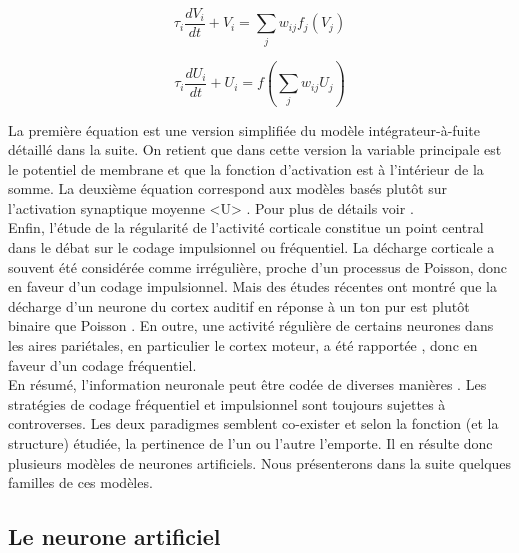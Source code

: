\begin{center}
\begin{equation} 
\tau_i \frac{dV_i}{dt}+V_i= \sum_{j} {w_{ij} f_j(V_j)} 
 \end{equation}
\label{vol}
\end{center}

\begin{center}
\begin{equation} 
\tau_i \frac{dU_i}{dt}+U_i= f(\sum_{j} {w_{ij} U_j} )
 \end{equation}
\label{act}
\end{center}

La première équation est une version simplifiée du modèle intégrateur-à-fuite détaillé dans la suite. On retient que dans cette version la variable principale est le potentiel de membrane et que la fonction d'activation est à l'intérieur de la somme. La deuxième équation correspond aux modèles basés plutôt sur l'activation synaptique moyenne <U> \cite{Gutkin:2003, Wilson:1972, Pinto:1996}. Pour plus de détails voir \cite{Ermentrout:1998}.\\

Enfin, l'étude de la régularité de l'activité corticale constitue un point central dans le débat sur le codage impulsionnel ou fréquentiel. La décharge corticale a souvent été considérée comme irrégulière, proche d'un processus de Poisson, donc en faveur d'un codage impulsionnel. Mais des études récentes ont montré que la décharge d'un neurone du cortex auditif en réponse à un ton pur est plutôt binaire que Poisson \cite{DeWeese:2003}. En outre, une activité régulière de certains neurones dans les aires pariétales, en particulier le cortex moteur, a été rapportée \cite{Lee:1998, Maimon:2009}, donc en faveur d'un codage fréquentiel.\\

En résumé, l'information neuronale peut être codée de diverses manières \cite{Perkel:1968}. Les stratégies de codage fréquentiel et impulsionnel sont toujours sujettes à controverses. Les deux paradigmes semblent co-exister et selon la fonction (et la structure) étudiée, la pertinence de l'un ou l'autre l'emporte. Il en résulte donc plusieurs modèles de neurones artificiels. Nous présenterons dans la suite quelques familles de ces modèles.

\subsection{Le neurone artificiel}

